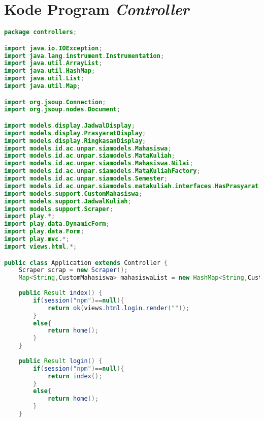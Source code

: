 \chapter{Kode Program \textit{Controller}}

\singlespacing 
%
%
\begin{lstlisting}[language=Java,basicstyle=\tiny,caption=Application.java]
package controllers;

import java.io.IOException;
import java.lang.instrument.Instrumentation;
import java.util.ArrayList;
import java.util.HashMap;
import java.util.List;
import java.util.Map;

import org.jsoup.Connection;
import org.jsoup.nodes.Document;

import models.display.JadwalDisplay;
import models.display.PrasyaratDisplay;
import models.display.RingkasanDisplay;
import models.id.ac.unpar.siamodels.Mahasiswa;
import models.id.ac.unpar.siamodels.MataKuliah;
import models.id.ac.unpar.siamodels.Mahasiswa.Nilai;
import models.id.ac.unpar.siamodels.MataKuliahFactory;
import models.id.ac.unpar.siamodels.Semester;
import models.id.ac.unpar.siamodels.matakuliah.interfaces.HasPrasyarat;
import models.support.CustomMahasiswa;
import models.support.JadwalKuliah;
import models.support.Scraper;
import play.*;
import play.data.DynamicForm;
import play.data.Form;
import play.mvc.*;
import views.html.*;

public class Application extends Controller {
	Scraper scrap = new Scraper();
	Map<String,CustomMahasiswa> mahasiswaList = new HashMap<String,CustomMahasiswa>();
	
    public Result index() {
    	if(session("npm")==null){
    		return ok(views.html.login.render(""));
    	}
    	else{
    		return home();
    	}
    }
    
    public Result login() {
    	if(session("npm")==null){
    		return index();
    	}
    	else{
    		return home();
    	}
    }
    

\end{lstlisting}
